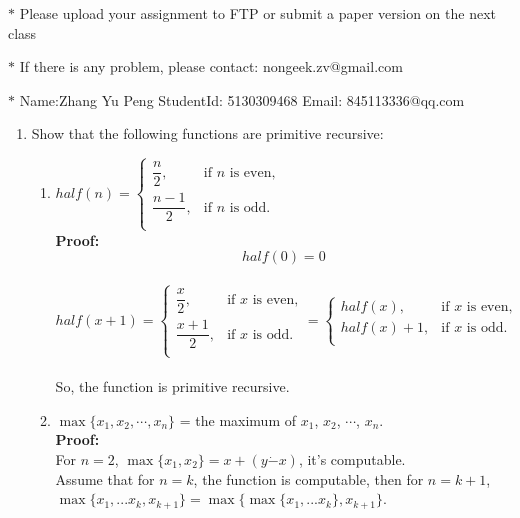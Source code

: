 \documentclass[12pt,a4paper]{article}
\theoremstyle{definition}
\numberwithin{equation}{section}
\numberwithin{figure}{section}
\begin{document}
\noindent{}
\begin{center}
\footnotesize{\color{red}$*$ Please upload your assignment to FTP or submit a paper version on the next class}

\footnotesize{\color{red}$*$ If there is any problem, please contact: nongeek.zv@gmail.com }

\footnotesize{\color{blue}$*$ Name:Zhang Yu Peng \quad StudentId: 5130309468 \quad Email: 845113336@qq.com}
\end{center}


\begin{enumerate}%

\item Show that the following functions are primitive recursive:
\begin{enumerate}
  \item $half(n)=\left\{\begin{array}{ll}
    \dfrac{n}{2}, & \mbox{if $n$ is even,} \\
    \dfrac{n-1}{2}, & \mbox{if $n$ is odd.} \\
  \end{array}\right.$\\
  
  \textbf{Proof:}\\
  $$half(0)=0$$\\
  $$half(x+1)=\left\{\begin{array}{ll}
  \dfrac{x}{2}, & \mbox{if $x$ is even,} \\
  \dfrac{x+1}{2}, & \mbox{if $x$ is odd.} \\
  \end{array} \right. = \left\{\begin{array}{ll}
  half(x),   & \mbox{if $x$ is even,} \\
  half(x)+1, & \mbox{if $x$ is odd.} \\
  \end{array}\right. $$\\
  So, the function is primitive recursive.
  
  \item $\max \{x_1, x_2, \cdots, x_n \}$ = the maximum of $x_1$, $x_2$, $\cdots$, $x_n$.\\
  \textbf{Proof:}\\
  For $n=2$, $\max \{x_1, x_2 \}  = x+(y \dot{-} x)$, it's computable.\\
  Assume that for $n=k$, the function is computable, then for $n=k+1$, $\max \{x_1,...x_k,x_{k+1} \}= \max \{ \max \{ x_1,...x_k \}, x_{k+1} \} $.
  

\end{enumerate}
\end{enumerate}
\end{document}
